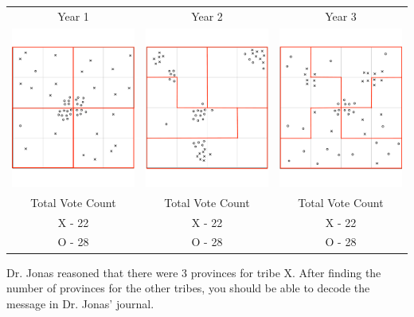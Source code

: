 \begin{tabular}{c c c }

Year 1 & Year 2 & Year 3 \\
 \includegraphics[width=2in]{assets/Gerrymandering/Gerry4x4-50-1Solution.pdf} &  \includegraphics[width=2in]{assets/Gerrymandering/Gerry4x4-50-2Solution.pdf} &  \includegraphics[width=2in]{assets/Gerrymandering/Gerry4x4-50-3Solution.pdf}\\
 Total Vote Count &  Total Vote Count &  Total Vote Count\\
 X - 22 & X - 22 & X  - 22\\
 O - 28 & O - 28 & O - 28
\end{tabular}

Dr. Jonas reasoned that there were 3 provinces for tribe X.
After finding the number of provinces for the other tribes, you should be able to decode the message in Dr. Jonas' journal.
